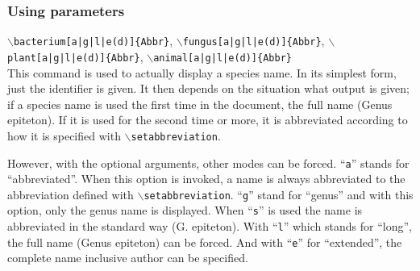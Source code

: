 \documentclass[a4paper]{article}
\begin{document}
      \subsubsection{Using parameters}
        \begin{description}
	  \item{{\tt $\backslash$bacterium[a|g|l|e(d)]\{Abbr\}}, {\tt $\backslash$fungus[a|g|l|e(d)]\{Abbr\}}, {\tt $\backslash$plant[a|g|l|e(d)]\{Abbr\}}, {\tt $\backslash$animal[a|g|l|e(d)]\{Abbr\}}}\\
	    This command is used to actually display a species name. In its simplest form, just the identifier is given. It then depends on the situation what output is given; if a species name is used the first time in the document, the full name (Genus epiteton). If it is used for the second time or more, it is abbreviated according to how it is specified with {\tt $\backslash$setabbreviation}.
	    
	    However, with the optional arguments, other modes can be forced. ``{\tt a}'' stands for ``abbreviated''. When this option is invoked, a name is always abbreviated to the abbreviation defined with {\tt $\backslash$setabbreviation}. ``{\tt g}'' stand for ``genus'' and with this option, only the genus name is displayed. When ``{\tt s}'' is used the name is abbreviated in the standard way (G. epiteton). With ``{\tt l}'' which stands for ``long'', the full name (Genus epiteton) can be forced. And with ``{\tt e}'' for ``extended'', the complete name inclusive author can be specified.
	\end{description}
  
  
\end{document}
